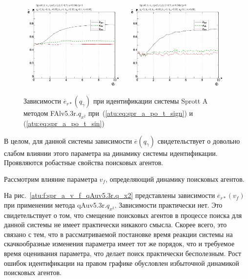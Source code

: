 \begin{figure}[h!]
  \centerline{
    \includegraphics[width=0.49\textwidth]{p/cha/spr_a/FAlv5.3A/sprott_a_FAlv5x3r-p_qg_e_sign.png}
    \hfill
    \includegraphics[width=0.49\textwidth]{p/cha/spr_a/FAlv5.3A/sprott_a_FAlv5x3r-p_qg_e_sin.png}
  }
  \caption{Зависимости $\overline{e}_{r*}(q_\gamma)$ при идентификации системы Sprott A методом FAlv5.3r.$q_{x^2}$
   при~(\ref{atu:eq:spr_a_po_t_sign}) и (\ref{atu:eq:spr_a_po_t_sin})}
  \label{atu:f:spr_a_qg_FAlv5.3r.q_x2}
\end{figure}

В целом, для данной системы
зависимости $\overline{e}( q_\gamma )$ %
свидетельствует о довольно слабом влиянии этого параметра
на динамику системы идентификации.
Проявляются робастные свойства поисковых агентов.


Рассмотрим влияние
параметра $v_f$, определяющий динамику поисковых агентов.


На рис.~\ref{atu:f:spr_a_v_f_qAuv5.3r.q_x2} представлены зависимости
$\overline{e}_{r*}(v_f)$ при применении метода qAuv5.3r.$q_{x^2}$.
Зависимости практически нет. Это свидетельствует о том,
что смещение поисковых агентов в процессе поиска
для данной системы не имеет практически никакого смысла.
Скорее всего, это связано с тем, что в рассматриваемой постановке
время реакции системы на скачкообразные изменения параметра
имеет тот же порядок, что и требуемое время оценивания параметра,
что делает поиск практически бесполезным.
Рост ошибок идентификации на правом графике обусловлен
избыточной динамикой поисковых агентов.




